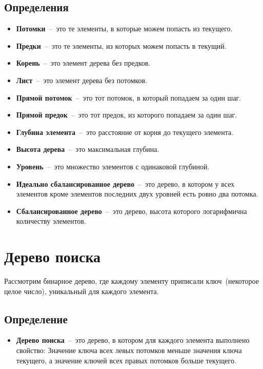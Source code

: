 \documentclass[12pt, a4paper]{report}			%
\begin{document}
\subsection{Определения}
\begin{itemize}
	\item \textbf{Потомки}~--~это те элементы, в которые можем попасть из текущего.
	\item \textbf{Предки}~--~это те элементы, из которых можем попасть в текущий.
	\item \textbf{Корень}~--~это элемент дерева без предков.
	\item \textbf{Лист}~--~это элемент дерева без потомков.
	\item \textbf{Прямой потомок}~--~это тот потомок, в который попадаем за один шаг.
	\item \textbf{Прямой предок}~--~это тот предок, из которого попадаем за один шаг.
	\item \textbf{Глубина элемента}~--~это расстояние от корня до текущего элемента.
	\item \textbf{Высота дерева}~--~это максимальная глубина.
	\item \textbf{Уровень}~--~это множество элементов с одинаковой глубиной.
	\item \textbf{Идеально сбалансированное дерево}~--~это дерево, в котором у всех элементов кроме элементов последних 
	двух уровней есть ровно два потомка.
	\item \textbf{Сбалансированное дерево}~--~это дерево, высота которого логарифмична количеству элементов.
\end{itemize}

\section{Дерево поиска}

Рассмотрим бинарное дерево, где каждому элементу приписали ключ~(некоторое целое число), уникальный 
для каждого элемента.

\subsection{Определение}
\begin{itemize}
	\item \textbf{Дерево поиска}~--~это дерево, в котором для каждого элемента выполнено свойство: Значение ключа всех 
	левых потомков меньше значения ключа текущего, а значение ключей всех правых потомков больше текущего.
\end{itemize}
\end{document}
